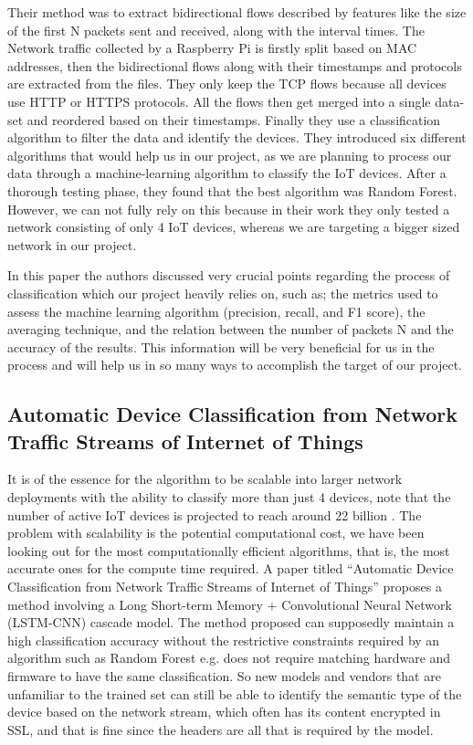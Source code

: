 \documentclass{article}
\begin{document}
Their method was to extract bidirectional flows described by features like the size of the first N packets sent and received, along with the interval times. The Network traffic collected by a Raspberry Pi is firstly split based on MAC addresses, then the bidirectional flows along with their timestamps and protocols are extracted from the files. They only keep the TCP flows because all devices use HTTP or HTTPS protocols. All the flows then get merged into a single data-set and reordered based on their timestamps. Finally they use a classification algorithm to filter the data and identify the devices. They introduced six different algorithms that would help us in our project, as we are planning to process our data through a machine-learning algorithm to classify the IoT devices. After a thorough testing phase, they found that the best algorithm was Random Forest. However, we can not fully rely on this because in their work they only tested a network consisting of only 4 IoT devices, whereas we are targeting a bigger sized network in our project. \pagebreak

In this paper the authors discussed very crucial points regarding the process of classification which our project heavily relies on, such as; the metrics used to assess the machine learning algorithm (precision, recall, and F1 score), the averaging technique, and the relation between the number of packets N and the accuracy of the results. This information will be very beneficial for us in the process and will help us in so many ways to accomplish the target of our project.

\subsection{Automatic Device Classification from Network Traffic Streams of Internet of Things}
It is of the essence for the algorithm to be scalable into larger network deployments with the ability to classify more than just 4 devices, note that the number of active IoT devices is projected to reach around 22 billion \cite{StateoftheIoT2018}. The problem with scalability is the potential computational cost, we have been looking out for the most computationally efficient algorithms, that is, the most accurate ones for the compute time required. A paper titled “Automatic Device Classification from Network Traffic Streams of Internet of Things” \cite{AutomaticDeviceClassificationfromNetwork} proposes a method involving a Long Short-term Memory + Convolutional Neural Network (LSTM-CNN) cascade model. The method proposed can supposedly maintain a high classification accuracy without the restrictive constraints required by an algorithm such as Random Forest e.g. does not require matching hardware and firmware to have the same classification. So new models and vendors that are unfamiliar to the trained set can still be able to identify the semantic type of the device based on the network stream, which often has its content encrypted in SSL, and that is fine since the headers are all that is required by the model. 
\end{document}
